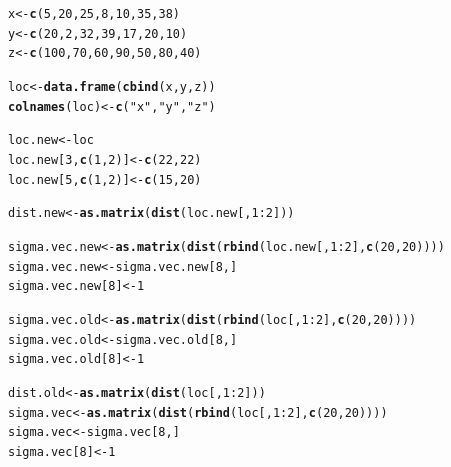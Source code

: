 \documentclass{article}\usepackage[]{graphicx}\usepackage[]{color}
\makeatletter
\newcommand{\hlnum}[1]{\textcolor[rgb]{0.686,0.059,0.569}{#1}}%
\newcommand{\hlstr}[1]{\textcolor[rgb]{0.192,0.494,0.8}{#1}}%
\newcommand{\hlopt}[1]{\textcolor[rgb]{0,0,0}{#1}}%
\newcommand{\hlstd}[1]{\textcolor[rgb]{0.345,0.345,0.345}{#1}}%
\newcommand{\hlkwb}[1]{\textcolor[rgb]{0.69,0.353,0.396}{#1}}%
\newcommand{\hlkwd}[1]{\textcolor[rgb]{0.737,0.353,0.396}{\textbf{#1}}}%
\newenvironment{kframe}{%
 \def\at@end@of@kframe{}%
 \ifinner\ifhmode%
  \def\at@end@of@kframe{\end{minipage}}%
  \begin{minipage}{\columnwidth}%
 \fi\fi%
 \def\FrameCommand##1{\hskip\@totalleftmargin \hskip-\fboxsep
 \colorbox{shadecolor}{##1}\hskip-\fboxsep
     \hskip-\linewidth \hskip-\@totalleftmargin \hskip\columnwidth}%
 \MakeFramed {\advance\hsize-\width
   \@totalleftmargin\z@ \linewidth\hsize
   \@setminipage}}%
 {\par\unskip\endMakeFramed%
 \at@end@of@kframe}
\newenvironment{knitrout}{}{} %
\makeatother
\begin{document}
\begin{knitrout}\footnotesize
{}\color{fgcolor}\begin{kframe}
\begin{alltt}
\hlstd{x} \hlkwb{<-} \hlkwd{c}\hlstd{(}\hlnum{5}\hlstd{,}\hlnum{20}\hlstd{,}\hlnum{25}\hlstd{,}\hlnum{8}\hlstd{,}\hlnum{10}\hlstd{,}\hlnum{35}\hlstd{,}\hlnum{38}\hlstd{)}
\hlstd{y} \hlkwb{<-} \hlkwd{c}\hlstd{(}\hlnum{20}\hlstd{,}\hlnum{2}\hlstd{,}\hlnum{32}\hlstd{,}\hlnum{39}\hlstd{,}\hlnum{17}\hlstd{,}\hlnum{20}\hlstd{,}\hlnum{10}\hlstd{)}
\hlstd{z} \hlkwb{<-} \hlkwd{c}\hlstd{(}\hlnum{100}\hlstd{,}\hlnum{70}\hlstd{,}\hlnum{60}\hlstd{,}\hlnum{90}\hlstd{,}\hlnum{50}\hlstd{,}\hlnum{80}\hlstd{,}\hlnum{40}\hlstd{)}

\hlstd{loc} \hlkwb{<-} \hlkwd{data.frame}\hlstd{(}\hlkwd{cbind}\hlstd{(x,y,z))}
\hlkwd{colnames}\hlstd{(loc)} \hlkwb{<-} \hlkwd{c}\hlstd{(}\hlstr{"x"}\hlstd{,} \hlstr{"y"}\hlstd{,} \hlstr{"z"}\hlstd{)}

\hlstd{loc.new} \hlkwb{<-} \hlstd{loc}
\hlstd{loc.new[}\hlnum{3}\hlstd{,}\hlkwd{c}\hlstd{(}\hlnum{1}\hlstd{,}\hlnum{2}\hlstd{)]} \hlkwb{<-} \hlkwd{c}\hlstd{(}\hlnum{22}\hlstd{,}\hlnum{22}\hlstd{)}
\hlstd{loc.new[}\hlnum{5}\hlstd{,}\hlkwd{c}\hlstd{(}\hlnum{1}\hlstd{,}\hlnum{2}\hlstd{)]} \hlkwb{<-} \hlkwd{c}\hlstd{(}\hlnum{15}\hlstd{,}\hlnum{20}\hlstd{)}

\hlstd{dist.new} \hlkwb{<-} \hlkwd{as.matrix}\hlstd{(}\hlkwd{dist}\hlstd{(loc.new[,}\hlnum{1}\hlopt{:}\hlnum{2}\hlstd{]))}

\hlstd{sigma.vec.new} \hlkwb{<-} \hlkwd{as.matrix}\hlstd{(}\hlkwd{dist}\hlstd{(}\hlkwd{rbind}\hlstd{(loc.new[,}\hlnum{1}\hlopt{:}\hlnum{2}\hlstd{],}\hlkwd{c}\hlstd{(}\hlnum{20}\hlstd{,}\hlnum{20}\hlstd{))))}
\hlstd{sigma.vec.new} \hlkwb{<-} \hlstd{sigma.vec.new[}\hlnum{8}\hlstd{,]}
\hlstd{sigma.vec.new[}\hlnum{8}\hlstd{]} \hlkwb{<-} \hlnum{1}

\hlstd{sigma.vec.old} \hlkwb{<-} \hlkwd{as.matrix}\hlstd{(}\hlkwd{dist}\hlstd{(}\hlkwd{rbind}\hlstd{(loc[,}\hlnum{1}\hlopt{:}\hlnum{2}\hlstd{],}\hlkwd{c}\hlstd{(}\hlnum{20}\hlstd{,}\hlnum{20}\hlstd{))))}
\hlstd{sigma.vec.old} \hlkwb{<-} \hlstd{sigma.vec.old[}\hlnum{8}\hlstd{,]}
\hlstd{sigma.vec.old[}\hlnum{8}\hlstd{]} \hlkwb{<-} \hlnum{1}

\hlstd{dist.old} \hlkwb{<-} \hlkwd{as.matrix}\hlstd{(}\hlkwd{dist}\hlstd{(loc[,}\hlnum{1}\hlopt{:}\hlnum{2}\hlstd{]))}
\hlstd{sigma.vec} \hlkwb{<-} \hlkwd{as.matrix}\hlstd{(}\hlkwd{dist}\hlstd{(}\hlkwd{rbind}\hlstd{(loc[,}\hlnum{1}\hlopt{:}\hlnum{2}\hlstd{],}\hlkwd{c}\hlstd{(}\hlnum{20}\hlstd{,}\hlnum{20}\hlstd{))))}
\hlstd{sigma.vec} \hlkwb{<-} \hlstd{sigma.vec[}\hlnum{8}\hlstd{,]}
\hlstd{sigma.vec[}\hlnum{8}\hlstd{]} \hlkwb{<-} \hlnum{1}



\end{alltt}
\end{kframe}
\end{knitrout}
\end{document}
